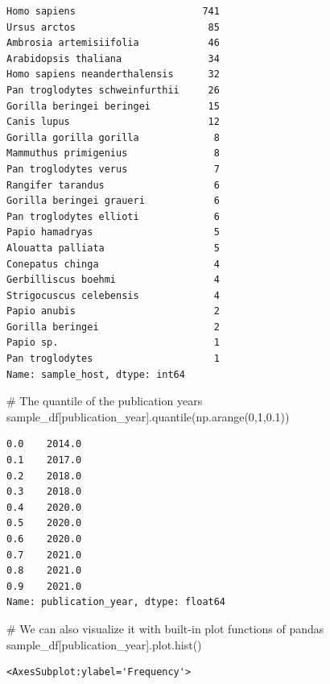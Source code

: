 \documentclass[
  letterpaper,
]{book}
\newenvironment{Shaded}{}{}
\newcommand{\CommentTok}[1]{\textcolor[rgb]{0.42,0.45,0.49}{#1}}
\newcommand{\DecValTok}[1]{\textcolor[rgb]{0.00,0.36,0.77}{#1}}
\newcommand{\FloatTok}[1]{\textcolor[rgb]{0.00,0.36,0.77}{#1}}
\newcommand{\NormalTok}[1]{\textcolor[rgb]{0.14,0.16,0.18}{#1}}
\newcommand{\StringTok}[1]{\textcolor[rgb]{0.01,0.18,0.38}{#1}}
\begin{document}
\begin{verbatim}
Homo sapiens                      741
Ursus arctos                       85
Ambrosia artemisiifolia            46
Arabidopsis thaliana               34
Homo sapiens neanderthalensis      32
Pan troglodytes schweinfurthii     26
Gorilla beringei beringei          15
Canis lupus                        12
Gorilla gorilla gorilla             8
Mammuthus primigenius               8
Pan troglodytes verus               7
Rangifer tarandus                   6
Gorilla beringei graueri            6
Pan troglodytes ellioti             6
Papio hamadryas                     5
Alouatta palliata                   5
Conepatus chinga                    4
Gerbilliscus boehmi                 4
Strigocuscus celebensis             4
Papio anubis                        2
Gorilla beringei                    2
Papio sp.                           1
Pan troglodytes                     1
Name: sample_host, dtype: int64
\end{verbatim}

\begin{Shaded}
\begin{Highlighting}[]
\CommentTok{\# The quantile of the publication years}
\NormalTok{sample\_df[}\StringTok{\textquotesingle{}publication\_year\textquotesingle{}}\NormalTok{].quantile(np.arange(}\DecValTok{0}\NormalTok{,}\DecValTok{1}\NormalTok{,}\FloatTok{0.1}\NormalTok{))}
\end{Highlighting}
\end{Shaded}

\begin{verbatim}
0.0    2014.0
0.1    2017.0
0.2    2018.0
0.3    2018.0
0.4    2020.0
0.5    2020.0
0.6    2020.0
0.7    2021.0
0.8    2021.0
0.9    2021.0
Name: publication_year, dtype: float64
\end{verbatim}

\begin{Shaded}
\begin{Highlighting}[]
\CommentTok{\# We can also visualize it with built{-}in plot functions of pandas}
\NormalTok{sample\_df[}\StringTok{\textquotesingle{}publication\_year\textquotesingle{}}\NormalTok{].plot.hist()}
\end{Highlighting}
\end{Shaded}

\begin{verbatim}
<AxesSubplot:ylabel='Frequency'>
\end{verbatim}
\end{document}

